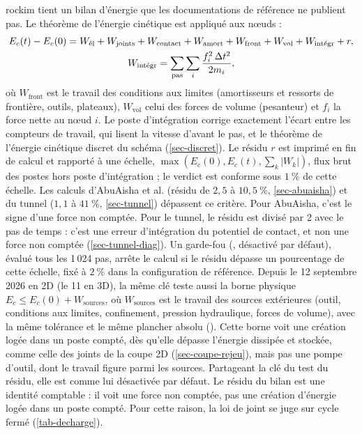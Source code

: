 rockim tient un bilan d'énergie que les documentations de référence ne publient pas. Le théorème de l'énergie cinétique est appliqué aux nœuds :
\begin{gather}
E_c(t) - E_c(0) = W_\text{él} + W_\text{joints} + W_\text{contact} + W_\text{amort} + W_\text{front} + W_\text{vol} + W_\text{intégr} + r, \label{eq-B4}\\
W_\text{intégr} = \sum_{\text{pas}}\sum_i \frac{f_i^2\,\Delta t^2}{2m_i}, \notag
\end{gather}
où $W_\text{front}$ est le travail des conditions aux limites (amortisseurs et ressorts de frontière, outils, plateaux), $W_\text{vol}$ celui des forces de volume (pesanteur) et $f_i$ la force nette au nœud $i$. Le poste d'intégration corrige exactement l'écart entre les compteurs de travail, qui lisent la vitesse d'avant le pas, et le théorème de l'énergie cinétique discret du schéma (\cref{sec-discret}). Le résidu $r$ est imprimé en fin de calcul et rapporté à une échelle, $\max(E_c(0), E_c(t), \sum_k |W_k|)$, flux brut des postes hors poste d'intégration ; le verdict est conforme sous $1~\%$ de cette échelle. Les calculs d'AbuAisha et al. (résidu de $2{,}5$ à $10{,}5~\%$, \cref{sec-abuaisha}) et du tunnel ($1{,}1$ à $41~\%$, \cref{sec-tunnel}) dépassent ce critère. Pour AbuAisha, c'est le signe d'une force non comptée. Pour le tunnel, le résidu est divisé par 2 avec le pas de temps : c'est une erreur d'intégration du potentiel de contact, et non une force non comptée (\cref{sec-tunnel-diag}). Un garde-fou (, désactivé par défaut), évalué tous les 1\,024 pas, arrête le calcul si le résidu dépasse un pourcentage de cette échelle, fixé à $2~\%$ dans la configuration de référence. Depuis le 12 septembre 2026 en 2D (le 11 en 3D), la même clé teste aussi la borne physique $E_c \leq E_c(0) + W_\text{sources}$, où $W_\text{sources}$ est le travail des sources extérieures (outil, conditions aux limites, confinement, pression hydraulique, forces de volume), avec la même tolérance et le même plancher absolu (). Cette borne voit une création logée dans un poste compté, dès qu'elle dépasse l'énergie dissipée et stockée, comme celle des joints de la coupe 2D (\cref{sec-coupe-rejeu}), mais pas une pompe d'outil, dont le travail figure parmi les sources. Partageant la clé du test du résidu, elle est comme lui désactivée par défaut. Le résidu du bilan est une identité comptable : il voit une force non comptée, pas une création d'énergie logée dans un poste compté. Pour cette raison, la loi de joint se juge sur cycle fermé (\cref{tab-decharge}).

